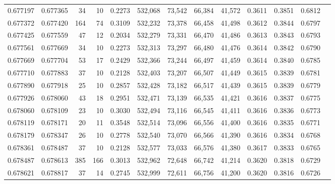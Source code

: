 \begin{tabular}{rrrrrrrrrrrrr}
0.677197 & 0.677365 &    34 &  10 &                                     0.2273 & 532,068 &  73,542 &  66,384 &  41,572 & 0.3611 & 0.3851 & 0.6812 \\
0.677372 & 0.677420 &   164 &  74 &                                     0.3109 & 532,232 &  73,378 &  66,458 &  41,498 & 0.3612 & 0.3844 & 0.6797 \\
0.677425 & 0.677559 &    47 &  12 &                                     0.2034 & 532,279 &  73,331 &  66,470 &  41,486 & 0.3613 & 0.3843 & 0.6793 \\
0.677561 & 0.677669 &    34 &  10 &                                     0.2273 & 532,313 &  73,297 &  66,480 &  41,476 & 0.3614 & 0.3842 & 0.6790 \\
0.677669 & 0.677704 &    53 &  17 &                                     0.2429 & 532,366 &  73,244 &  66,497 &  41,459 & 0.3614 & 0.3840 & 0.6785 \\
0.677710 & 0.677883 &    37 &  10 &                                     0.2128 & 532,403 &  73,207 &  66,507 &  41,449 & 0.3615 & 0.3839 & 0.6781 \\
0.677890 & 0.677918 &    25 &  10 &                                     0.2857 & 532,428 &  73,182 &  66,517 &  41,439 & 0.3615 & 0.3839 & 0.6779 \\
0.677926 & 0.678060 &    43 &  18 &                                     0.2951 & 532,471 &  73,139 &  66,535 &  41,421 & 0.3616 & 0.3837 & 0.6775 \\
0.678060 & 0.678109 &    23 &  10 &                                     0.3030 & 532,494 &  73,116 &  66,545 &  41,411 & 0.3616 & 0.3836 & 0.6773 \\
0.678119 & 0.678171 &    20 &  11 &                                     0.3548 & 532,514 &  73,096 &  66,556 &  41,400 & 0.3616 & 0.3835 & 0.6771 \\
0.678179 & 0.678347 &    26 &  10 &                                     0.2778 & 532,540 &  73,070 &  66,566 &  41,390 & 0.3616 & 0.3834 & 0.6768 \\
0.678361 & 0.678487 &    37 &  10 &                                     0.2128 & 532,577 &  73,033 &  66,576 &  41,380 & 0.3617 & 0.3833 & 0.6765 \\
0.678487 & 0.678613 &   385 & 166 &                                     0.3013 & 532,962 &  72,648 &  66,742 &  41,214 & 0.3620 & 0.3818 & 0.6729 \\
0.678621 & 0.678817 &    37 &  14 &                                     0.2745 & 532,999 &  72,611 &  66,756 &  41,200 & 0.3620 & 0.3816 & 0.6726 \\

\end{tabular}
